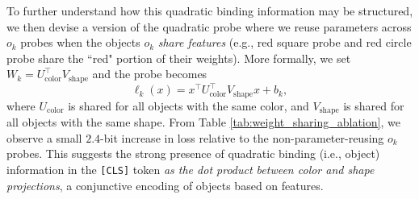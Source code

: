 \documentclass{article}
\theoremstyle{plain}
\theoremstyle{definition}
\theoremstyle{remark}
\begin{document}
\begin{table}[H]
\centering
\caption{\textbf{Average performance of object and feature code probes for different probe families when $z$ is the \texttt{[CLS]} token.} We report error reduction (ER) relative to the trivial majority-label baseline, which achieves $71.9\%$ accuracy for object codes and $75.0\%$ accuracy for feature codes.  Numbers in parentheses denote the number of parameters relative to the corresponding linear probe.}
\label{cls_probe}
\end{table}

To further understand how this quadratic binding information may be structured, we then devise a version of the quadratic probe where we reuse parameters across $o_k$ probes when the objects $o_k$ \textit{share features} (e.g., red square probe and red circle probe share the ``red" portion of their weights). More formally, we set $W_k=U_{\text{color}}^\top
V_{\text{shape}}$ and the probe becomes \[\ell_k(x)=x ^\top U_{\text{color}}^\top
V_{\text{shape}} x+b_k,\] where $U_{\text{color}}$ is shared for all objects with the same color, and $V_{\text{shape}}$ is shared for all objects with the same shape. From Table \ref{tab:weight_sharing_ablation}, we observe a small $2.4$-bit increase in loss relative to the non-parameter-reusing $o_k$ probes. This suggests the strong presence of quadratic binding (i.e., object) information in the \texttt{[CLS]} token \textit{as the dot product between color and shape projections}, a conjunctive encoding of objects based on features.
\end{document}
